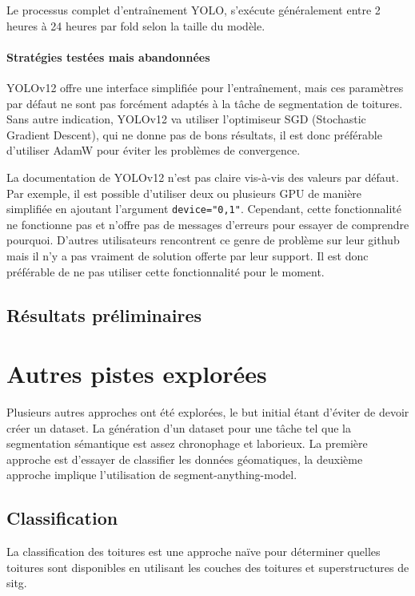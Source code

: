Le processus complet d'entraînement YOLO, s'exécute généralement entre 2 heures à 24 heures par fold selon la taille du modèle.

\paragraph{Stratégies testées mais abandonnées}
YOLOv12 offre une interface simplifiée pour l'entraînement, mais ces paramètres par défaut ne sont pas forcément adaptés à la tâche de segmentation de toitures. Sans autre indication, YOLOv12 va utiliser l'optimiseur SGD (Stochastic Gradient Descent), qui ne donne pas de bons résultats, il est donc préférable d'utiliser AdamW pour éviter les problèmes de convergence.

La documentation de YOLOv12 n'est pas claire vis-à-vis des valeurs par défaut. Par exemple, il est possible d'utiliser deux ou plusieurs GPU de manière simplifiée en ajoutant l'argument \texttt{device="0,1"}. Cependant, cette fonctionnalité ne fonctionne pas et n'offre pas de messages d'erreurs pour essayer de comprendre pourquoi. D'autres utilisateurs rencontrent ce genre de problème sur leur github mais il n'y a pas vraiment de solution offerte par leur support. Il est donc préférable de ne pas utiliser cette fonctionnalité pour le moment.

\subsection{Résultats préliminaires}


\newpage
\section{Autres pistes explorées}
\label{sec:pistes_explorees}
Plusieurs autres approches ont été explorées, le but initial étant d'éviter de devoir créer un dataset. La génération d'un dataset pour une tâche tel que la segmentation sémantique est assez chronophage et laborieux. La première approche est d'essayer de classifier les données géomatiques, la deuxième approche implique l'utilisation de segment-anything-model.

\subsection{Classification}
La classification des toitures est une approche naïve pour déterminer quelles toitures sont disponibles en utilisant les couches des toitures et superstructures de \acrshort{sitg}.


